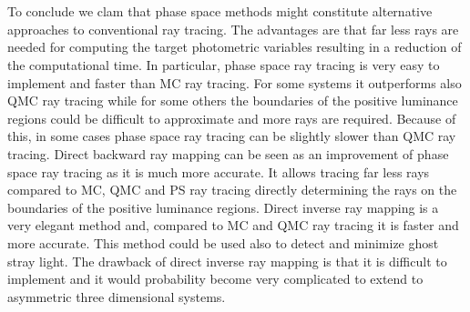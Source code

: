 \\ \\ \indent To conclude we clam that phase space methods might constitute alternative approaches to conventional ray tracing. The advantages are that far less rays are needed for computing the target photometric variables resulting in a reduction of the computational time. In particular, phase space ray tracing is very easy to implement and faster than MC ray tracing. For some systems it outperforms also QMC ray tracing while for some others the boundaries of the positive luminance regions could be difficult to approximate and more rays are required. Because of this, in some cases phase space ray tracing can be slightly slower than QMC ray tracing. Direct backward ray mapping can be seen as an improvement of phase space ray tracing as it is much more accurate. It allows tracing far less rays compared to MC, QMC and PS ray tracing directly determining the rays on the boundaries of the positive luminance regions. Direct inverse ray mapping is a very elegant method and, compared to MC and QMC ray tracing it is faster and more accurate. This method could be used also to detect and minimize ghost stray light. The drawback of direct inverse ray mapping is that it is difficult to implement and it would probability become very complicated to extend to asymmetric three dimensional systems.
